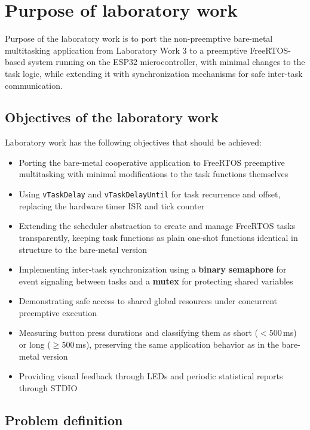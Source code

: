 \section{Purpose of laboratory work}

Purpose of the laboratory work is to port the non-preemptive bare-metal multitasking
application from Laboratory Work 3 to a preemptive FreeRTOS-based system running on the
ESP32 microcontroller, with minimal changes to the task logic, while extending it with
synchronization mechanisms for safe inter-task communication.

\subsection{Objectives of the laboratory work}

Laboratory work has the following objectives that should be achieved:

\begin{itemize}
  \item Porting the bare-metal cooperative application to FreeRTOS preemptive multitasking
    with minimal modifications to the task functions themselves
  \item Using \texttt{vTaskDelay} and \texttt{vTaskDelayUntil} for task recurrence and offset,
    replacing the hardware timer ISR and tick counter
  \item Extending the scheduler abstraction to create and manage FreeRTOS tasks transparently,
    keeping task functions as plain one-shot functions identical in structure to the bare-metal version
  \item Implementing inter-task synchronization using a \textbf{binary semaphore} for event
    signaling between tasks and a \textbf{mutex} for protecting shared variables
  \item Demonstrating safe access to shared global resources under concurrent preemptive execution
  \item Measuring button press durations and classifying them as short ($<500$\,ms) or long
    ($\geq 500$\,ms), preserving the same application behavior as in the bare-metal version
  \item Providing visual feedback through LEDs and periodic statistical reports through STDIO
\end{itemize}

\subsection{Problem definition}

